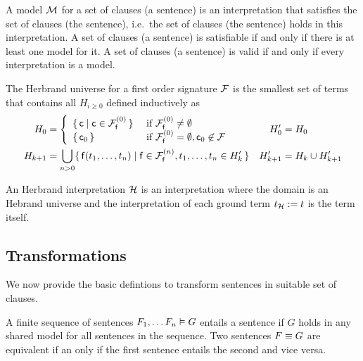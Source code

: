 \begin{definition}
	A {\myem model} $\mathcal{M}$ for a set of clauses (a sentence) is an interpretation that
	{\myem satisfies} the set of clauses (the sentence),
	i.e.~the set of clauses (the sentence) holds in this interpretation.
	A set of clauses (a sentence) is {\myem satisfiable} if and only if there is at least one model for it.
	A set of clauses (a sentence) is {\myem valid} if and only if every interpretation is a model.
\end{definition}

\begin{definition}\label{def:hk}
	The {\myem Herbrand universe} for a first order signature $\mathcal{F}$
	is the smallest set of terms that contains all $H_{i\geq 0}$ defined inductively as
	\begin{align*}
	H_0 &= \left\{
	\begin{array}{ll}
	\{\,\mc \mid \mc\in\mcFfn[0]\,\} 
	&\text{if } \mcFfn[0]\not=\emptyset\\
	\{\,\mc_0\,\}
	&\text{if } \mcFfn[0]=\emptyset, \mc_0\not\in\mcF
	\end{array}
	\right.
	&
	H'_0 &= H_0
	\\
	H_{k+1} &= \bigcup_{n> 0}
	\{\,
	\mf(t_1,\ldots,t_n) \mid
	\mf\in\mcFfn[n],
	t_1,\ldots,t_n \in H_k'
	\,\}
	&
	H'_{k+1} &= H_k \cup H'_{k+1}
	\end{align*}

\end{definition}

\begin{definition}
	An {\myem Herbrand interpretation} $\mathcal{H}$ is an interpretation where the domain
	is an Hebrand universe
	and the interpretation of each ground term $t_{\mathcal{H}} := t$ is the term itself.
\end{definition}

\subsection{Transformations}

\IMPROVE
We now provide the basic defintions to transform sentences in suitable set of clauses.

\begin{definition}[Equivalence]
	A finite sequence of sentences $F_1, \ldots F_n \vDash G$ entails a sentence
	if $G$ holds in any shared model for all sentences in the sequence.
	Two sentences $F \equiv G$ are equivalent
	if an only if the first sentence entails the second and vice versa.
\end{definition}

